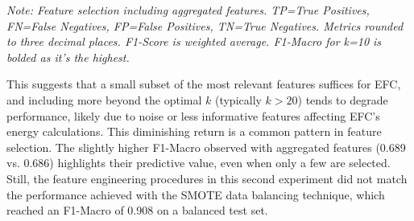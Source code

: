 \documentclass[12pt]{article}
\begin{document}
\begin{table}[htb]
  \centering
  \caption{EFC Performance with Feature Selection (Aggregated Features Included) for Varying k (Experiment 2 - Scenario 2).}
  \label{tab:fs_included_agg_results}
  \par\medskip
  \footnotesize
  \textit{Note: Feature selection including aggregated features. TP=True Positives, FN=False Negatives, FP=False Positives,
  TN=True Negatives. Metrics rounded to three decimal places. F1-Score is weighted average. F1-Macro for k=10 is bolded
  as it's the highest.}
\end{table}

This suggests that a small subset of the most relevant features suffices for EFC, and including more beyond the optimal $k$
(typically $k>20$) tends to degrade performance, likely due to noise or less informative features affecting EFC's energy
calculations. This diminishing return is a common pattern in feature selection. The slightly higher F1-Macro observed with
aggregated features (0.689 vs. 0.686) highlights their predictive value, even when only a few are selected. Still, the feature
engineering procedures in this second experiment did not match the performance achieved with the SMOTE data balancing technique,
which reached an F1-Macro of 0.908 on a balanced test set.
\end{document}

